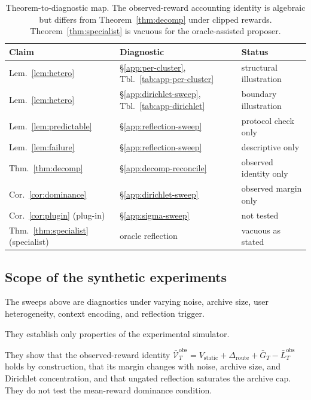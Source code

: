 \documentclass{article} %
\begin{document}
\begin{table}[h]
\centering
\small
\begin{tabular}{lll}
\toprule
Claim & Diagnostic & Status \\
\midrule
Lem.~\ref{lem:hetero} & \S\ref{app:per-cluster}, Tbl.~\ref{tab:app-per-cluster} & structural illustration \\
Lem.~\ref{lem:hetero} & \S\ref{app:dirichlet-sweep}, Tbl.~\ref{tab:app-dirichlet} & boundary illustration \\
Lem.~\ref{lem:predictable} & \S\ref{app:reflection-sweep} & protocol check only \\
Lem.~\ref{lem:failure} & \S\ref{app:reflection-sweep} & descriptive only \\
Thm.~\ref{thm:decomp} & \S\ref{app:decomp-reconcile} & observed identity only \\
Cor.~\ref{cor:dominance} & \S\ref{app:dirichlet-sweep} & observed margin only \\
Cor.~\ref{cor:plugin} (plug-in) & \S\ref{app:sigma-sweep} & not tested \\
Thm.~\ref{thm:specialist} (specialist) & oracle reflection & vacuous as stated \\
\bottomrule
\end{tabular}
\caption{Theorem-to-diagnostic map. The observed-reward accounting identity is
algebraic but differs from Theorem~\ref{thm:decomp} under clipped rewards.
Theorem~\ref{thm:specialist} is vacuous for the oracle-assisted proposer.}
\label{tab:app-coverage-sweeps}
\end{table}

\subsection{Scope of the synthetic experiments}

\label{app:what-not}

The sweeps above are diagnostics under varying noise, archive size, user
heterogeneity, context encoding, and reflection trigger.

They establish only properties of the experimental simulator.

They show that the observed-reward identity
\(\bar{\mathcal V}_T^{\mathrm{obs}}
=V_{\mathrm{static}}+\Delta_{\mathrm{route}}+\bar G_T
-\bar L_T^{\mathrm{obs}}\) holds by construction, that its margin changes with
noise, archive size, and Dirichlet concentration, and that ungated reflection
saturates the archive cap. They do not test the mean-reward dominance
condition.
\end{document}
